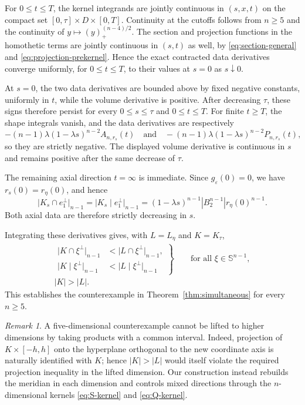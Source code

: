 \documentclass[11pt]{article}
\theoremstyle{remark}
\newtheorem{remark}[theorem]{Remark}
\newcommand{\Sph}{\mathbb{S}}
\newcommand{\pos}[1]{(#1)_{+}}
\begin{document}
For $0\leq t\leq T$, the kernel integrands are jointly continuous in
$(s,x,t)$ on the compact set
$[0,\tau]\times D\times[0,T]$.
Continuity at the cutoffs follows from $n\geq5$ and the continuity of
$y\mapsto\pos{y}^{(n-4)/2}$.  The section and projection functions in the
homothetic terms are jointly continuous in $(s,t)$ as well, by
\eqref{eq:section-general} and \eqref{eq:projection-prekernel}.  Hence the
exact contracted data derivatives converge uniformly, for
$0\leq t\leq T$, to their values at $s=0$ as $s\downarrow0$.

At $s=0$, the two data derivatives are bounded above by fixed negative
constants, uniformly in $t$, while the volume derivative is positive.
After decreasing $\tau$, these signs therefore persist for every
$0\leq s\leq\tau$ and $0\leq t\leq T$.  For finite $t\geq T$, the shape
integrals vanish, and the data derivatives are respectively
\[
 -(n-1)\lambda(1-\lambda s)^{n-2}A_{n,r_s}(t)
 \quad\text{and}\quad
 -(n-1)\lambda(1-\lambda s)^{n-2}P_{n,r_s}(t),
\]
so they are strictly negative.  The displayed volume derivative is
continuous in $s$ and remains positive after the same decrease of $\tau$.

The remaining axial direction $t=\infty$ is immediate.  Since
$g_\varepsilon(0)=0$, we have $r_s(0)=r_\eta(0)$, and hence
\[
 \bigl|K_s\cap e_1^\perp\bigr|_{n-1}
 =\bigl|K_s\mid e_1^\perp\bigr|_{n-1}
 =(1-\lambda s)^{n-1}|B_2^{n-1}|r_\eta(0)^{n-1}.
\]
Both axial data are therefore strictly decreasing in $s$.


Integrating these derivatives gives, with $
 L=L_\eta$ and  $K=K_\tau$,
\[
 \begin{gathered}
  \left.
  \begin{aligned}
   \bigl|K\cap\xi^\perp\bigr|_{n-1}
    &<\bigl|L\cap\xi^\perp\bigr|_{n-1},\\
   \bigl|K\mid\xi^\perp\bigr|_{n-1}
    &<\bigl|L\mid\xi^\perp\bigr|_{n-1}
  \end{aligned}
  \right\}
  \qquad\text{for all }\xi\in\Sph^{n-1},\\
  |K|>|L|.
 \end{gathered}
\]
This establishes the counterexample in
Theorem~\ref{thm:simultaneous} for every $n\geq5$.


\begin{remark}
A five-dimensional counterexample cannot be lifted to higher dimensions by
taking products with a common interval.  Indeed, projection of
$K\times[-h,h]$ onto the hyperplane orthogonal to the new coordinate axis
is naturally identified with $K$; hence $|K|>|L|$ would itself violate the
required projection inequality in the lifted dimension.  Our construction
instead rebuilds the meridian in each dimension and controls mixed
directions through the $n$-dimensional kernels
\eqref{eq:S-kernel} and \eqref{eq:Q-kernel}.
\end{remark}
\end{document}
